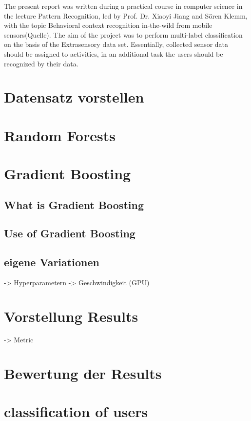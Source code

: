 \documentclass[a4paper,12pt]{scrartcl}
\newcommand{\gr}{\grqq{}}
\newcommand{\gl}{\glqq}
\begin{document}
The present report was written during a practical course in computer science in the lecture Pattern Recognition, led by Prof. Dr. Xiaoyi Jiang and Sören Klemm, with the topic \gl Behavioral context recognition in-the-wild from mobile sensors\gr (Quelle). The aim of the project was to perform multi-label classification on the basis of the Extrasensory data set. Essentially, collected sensor data should be assigned to activities, in an additional task the users should be recognized by their data. 



\section{Datensatz vorstellen}

\section{Random Forests}

\section{Gradient Boosting}

\subsection{What is Gradient Boosting}

\subsection{Use of Gradient Boosting}

\subsection{eigene Variationen}
-> Hyperparametern
-> Geschwindigkeit (GPU)


\section{Vorstellung Results}
-> Metric

\section{Bewertung der Results}

\section{classification of users}
\end{document}
